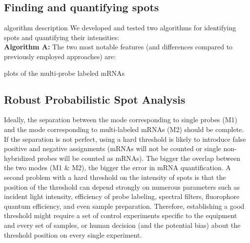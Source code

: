 \documentclass[10pt]{article}
\begin{document}
\begin{spacing}{1.5}
\subsection*{Finding and quantifying spots}
algorithm description 
We developed and tested two algorithms for identifying spots and quantifying their intensities: \\
\textbf{Algorithm A:} The two most notable features (and differences compared to previously employed approaches) are:

plots of the multi-probe labeled mRNAs

\subsection*{Robust Probabilistic Spot Analysis}
Ideally, the separation between the mode corresponding to single probes (M1) and the mode corresponding to multi-labeled mRNAs (M2) should be complete. If the separation is not perfect, using a hard threshold is likely to introduce false positive and negative assignments (mRNAs will not be counted or single non-hybridized probes will be counted as mRNAs). The bigger the overlap between the two modes (M1 \& M2), the bigger the error in mRNA quantification. A second problem with a hard threshold on the intensity of spots is that the position of the threshold can depend  strongly on numerous parameters such as incident light intensity, efficiency of probe labeling, spectral filters, fluorophore quantum efficiency, and even sample preparation. Therefore, establishing a good threshold might require a set of control experiments specific to the equipment and  every set of samples, or human decision (and the potential bias) about the threshold position on every single experiment. \\


\end{spacing}
\end{document}
